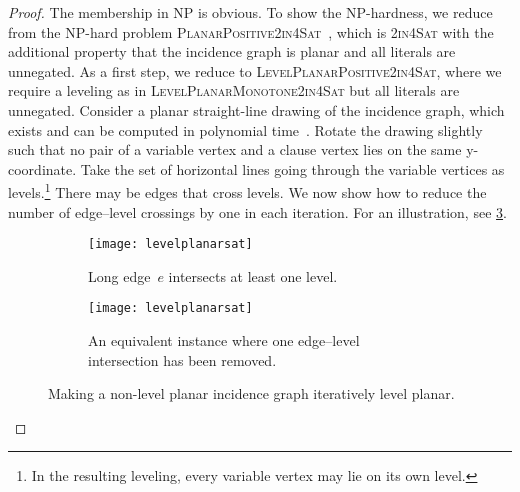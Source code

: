 \documentclass[runningheads]{llncs}
\begin{document}
\begin{proof}
    The membership in NP is obvious.  To show the NP-hardness,
    we reduce from the NP-hard problem \textsc{PlanarPositive2in4Sat}~\cite{kkw-cbvop-07},
    which is \textsc{2in4Sat} with the additional property that the incidence graph is planar and all literals are unnegated.
    As a first step, we reduce to \textsc{LevelPlanarPositive2in4Sat},
    where we require a leveling as in \textsc{LevelPlanarMonotone2in4Sat}
    but all literals are unnegated.
    Consider a planar straight-line drawing of the incidence graph,
    which exists and can be computed in polynomial time~\cite{fpp-hdpgg-90,DBLP:conf/soda/Schnyder90}.
    Rotate the drawing slightly such that no pair of a variable vertex
    and a clause vertex lies on the same y-coordinate.
    Take the set of horizontal lines going through
    the variable vertices as levels.\footnote{%
        In the resulting leveling, every
        variable vertex may lie on its own level.}
    There may be edges that cross levels.
    We now show how to reduce the number of edge--level crossings
    by one in each iteration.
    For an illustration, see \cref{fig:make-level-planar}.
    
    \begin{figure}[t]
        \begin{subfigure}[t]{.4 \textwidth}
            \centering
            \texttt{[image: levelplanarsat]}
            \caption{Long edge~$e$ intersects at least one level.}
            \label{fig:make-level-planar-a}
        \end{subfigure}
        \hfill
        \begin{subfigure}[t]{.5 \textwidth}
            \centering
            \texttt{[image: levelplanarsat]}
            \caption{An equivalent instance where one edge--level
                intersection has been removed.}
            \label{fig:make-level-planar-b}
        \end{subfigure}
        \caption{Making a non-level planar incidence graph iteratively level planar.}
        \label{fig:make-level-planar}
    \end{figure}
    

\end{proof}
\end{document}
